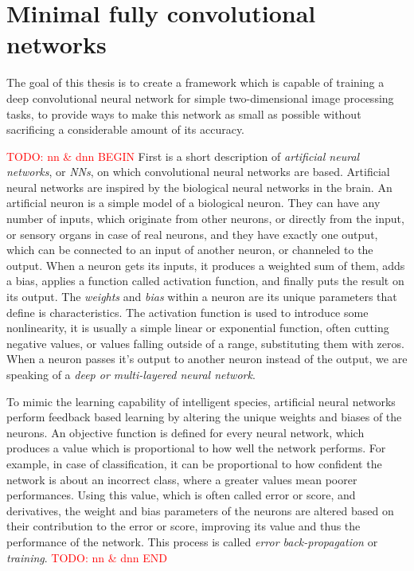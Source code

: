 \documentclass[12pt]{report}
\newcommand\todo[1]{\textcolor{red}{#1}}
\begin{document}
\section{Minimal fully convolutional networks}
The goal of this thesis is to create a framework which is capable of training a deep convolutional neural network for simple two-dimensional image processing tasks, to provide ways to make this network as small as possible without sacrificing a considerable amount of its accuracy.\par
\todo{TODO: nn \& dnn BEGIN} First is a short description of\textit{ artificial neural networks}, or \textit{NNs}, on which convolutional neural networks are based. Artificial neural networks are inspired by the biological neural networks in the brain. An artificial neuron is a simple model of a biological neuron. They can have any number of inputs, which originate from other neurons, or directly from the input, or sensory organs in case of real neurons, and they have exactly one output, which can be connected to an input of another neuron, or channeled to the output. When a neuron gets its inputs, it produces a weighted sum of them, adds a bias, applies a function called activation function, and finally puts the result on its output. The \textit{weights} and \textit{bias} within a neuron are its unique parameters that define is characteristics. The activation function is used to introduce some nonlinearity, it is usually a simple linear or exponential function, often cutting negative values, or values falling outside of a range, substituting them with zeros. When a neuron passes it's output to another neuron instead of the output, we are speaking of a \textit{deep or multi-layered neural network}.\par
To mimic the learning capability of intelligent species, artificial neural networks perform feedback based learning by altering the unique weights and biases of the neurons. An objective function is defined for every neural network, which produces a value which is proportional to how well the network performs. For example, in case of classification, it can be proportional to how confident the network is about an incorrect class, where a greater values mean poorer performances. Using this value, which is often called error or score, and derivatives, the weight and bias parameters of the neurons are altered based on their contribution to the error or score, improving its value and thus the performance of the network. This process is called \textit{error back-propagation} or \textit{training}. \todo{TODO: nn \& dnn END}\par
\end{document}
